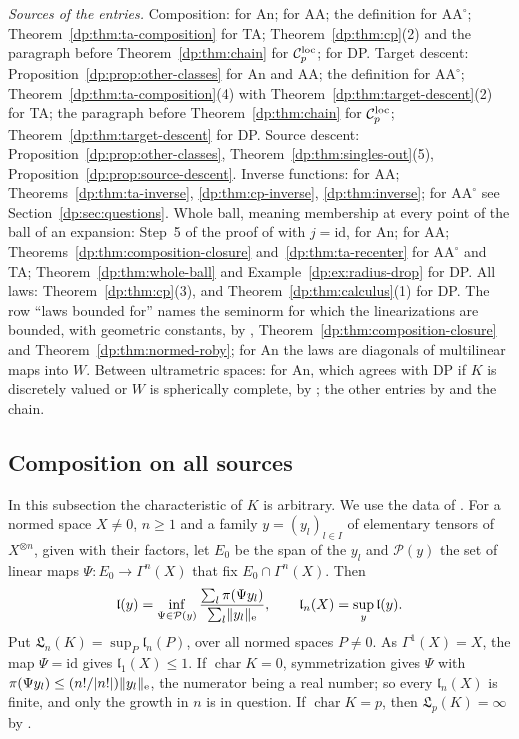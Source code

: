 \documentclass[11pt]{amsart}
\theoremstyle{definition}
\theoremstyle{remark}
\numberwithin{equation}{section}
\newcommand{\id}{\mathrm{id}}
\newcommand{\abs}[1]{\lvert #1\rvert}
\newcommand{\norm}[1]{\lVert #1\rVert}
\newcommand{\cC}{\mathcal{C}}
\theoremstyle{plain}
\theoremstyle{definition}
\theoremstyle{plain}
\begin{document}
\emph{Sources of the entries.} Composition: \cite[Proposition~14.26, proof, Step~1]{I} for An; \cite[Theorem~14.17]{I} for AA; the definition for $\mathrm{AA}^\circ$; Theorem~\ref{dp:thm:ta-composition} for TA; Theorem~\ref{dp:thm:cp}(2) and the paragraph before Theorem~\ref{dp:thm:chain} for $\cC_p^{\rm loc}$; \cite[Lemma~Q.3]{I} for DP. Target descent: Proposition~\ref{dp:prop:other-classes} for An and AA; the definition for $\mathrm{AA}^\circ$; Theorem~\ref{dp:thm:ta-composition}(4) with Theorem~\ref{dp:thm:target-descent}(2) for TA; the paragraph before Theorem~\ref{dp:thm:chain} for $\cC_p^{\rm loc}$; Theorem~\ref{dp:thm:target-descent} for DP. Source descent: Proposition~\ref{dp:prop:other-classes}, Theorem~\ref{dp:thm:singles-out}(5), Proposition~\ref{dp:prop:source-descent}. Inverse functions: \cite[Corollary~14.19(1)]{I} for AA; Theorems~\ref{dp:thm:ta-inverse}, \ref{dp:thm:cp-inverse}, \ref{dp:thm:inverse}; for $\mathrm{AA}^\circ$ see Section~\ref{dp:sec:questions}. Whole ball, meaning membership at every point of the ball of an expansion: Step~5 of the proof of \cite[Proposition~14.12]{I} with $j=\id$, for An; \cite[Proposition~14.12(2)]{I} for AA; Theorems~\ref{dp:thm:composition-closure} and~\ref{dp:thm:ta-recenter} for $\mathrm{AA}^\circ$ and TA; Theorem~\ref{dp:thm:whole-ball} and Example~\ref{dp:ex:radius-drop} for DP. All laws: Theorem~\ref{dp:thm:cp}(3), and Theorem~\ref{dp:thm:calculus}(1) for DP. The row ``laws bounded for'' names the seminorm for which the linearizations are bounded, with geometric constants, by \cite[Proposition~14.9(1)]{I}, Theorem~\ref{dp:thm:composition-closure} and Theorem~\ref{dp:thm:normed-roby}; for An the laws are diagonals of multilinear maps into $W$. Between ultrametric spaces: \cite[Proposition~14.40(3)]{I} for An, which agrees with DP if $K$ is discretely valued or $W$ is spherically complete, by \cite[Proposition~14.40(1)]{I}; the other entries by \cite[Theorem~14.39(1)]{I} and the chain.

\subsection{Composition on all sources}\label{dp:ssec:all-sources}

In this subsection the characteristic of $K$ is arbitrary. We use the data of \cite[Definition~14.15]{I}. For a normed space $X\ne0$, $n\ge1$ and a family $y=(y_l)_{l\in I}$ of elementary tensors of $X^{\otimes n}$, given with their factors, let $E_0$ be the span of the $y_l$ and $\mathcal P(y)$ the set of linear maps $\Psi\colon E_0\to\Gamma^n(X)$ that fix $E_0\cap\Gamma^n(X)$. Then
\[
 \mathfrak l(y)=\inf_{\Psi\in\mathcal P(y)}\frac{\sum_l\pi(\Psi y_l)}{\sum_l\norm{y_l}_{\rm e}},\qquad\mathfrak l_n(X)=\sup_y\mathfrak l(y).
\]
Put $\mathfrak L_n(K)=\sup_P\mathfrak l_n(P)$, over all normed spaces $P\ne0$. As $\Gamma^1(X)=X$, the map $\Psi=\id$ gives $\mathfrak l_1(X)\le1$. If $\operatorname{char}K=0$, symmetrization gives $\Psi$ with $\pi(\Psi y_l)\le(n!/\abs{n!})\norm{y_l}_{\rm e}$, the numerator being a real number; so every $\mathfrak l_n(X)$ is finite, and only the growth in $n$ is in question. If $\operatorname{char}K=p$, then $\mathfrak L_p(K)=\infty$ by \cite[Lemma~Q.9]{I}.
\end{document}
